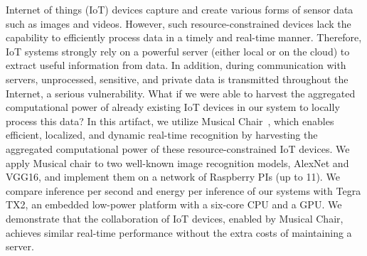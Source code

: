 Internet of things (IoT) devices capture and create various
forms of sensor data such as images and videos. However, such
resource-constrained devices lack the capability
to efficiently process data in a timely and real-time manner.
Therefore, IoT systems strongly rely on a powerful server
(either local or on the cloud) to extract useful information
from data. In addition, during communication with servers,
unprocessed, sensitive, and private data is transmitted
throughout the Internet, a serious vulnerability. What if we
were able to harvest the aggregated computational power
of already existing IoT devices in our system to locally
process this data? In this artifact, we utilize Musical
Chair~\cite{musical-chair}, which enables efficient,
localized, and dynamic real-time recognition by harvesting the
aggregated computational power of these resource-constrained
IoT devices. We apply Musical chair to two well-known image
recognition models, AlexNet and VGG16, and implement them on
a network of Raspberry PIs (up to 11). We compare inference
per second and energy per inference of our systems with Tegra
TX2, an embedded low-power platform with a six-core CPU and
a GPU. We demonstrate that the collaboration of IoT devices,
enabled by Musical Chair, achieves similar real-time
performance without the extra costs of maintaining a server.
